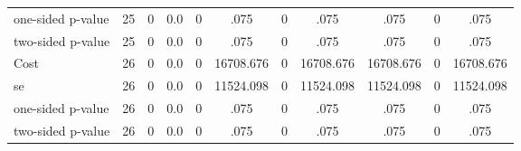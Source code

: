 \begin{tabular}{lcccccccccc}
one-sided p-value&        25 &         0 &       0.0 &         0 & .075 & 0 & .075 & .075 & 0 & .075 \\  
two-sided p-value&        25 &         0 &       0.0 &         0 & .075 & 0 & .075 & .075 & 0 & .075 \\  
Cost 			  &        26 &         0 &       0.0 &         0 & 16708.676 & 0 & 16708.676 & 16708.676 & 0 & 16708.676 \\  
se 				 &        26 &         0 &       0.0 &         0 & 11524.098 & 0 & 11524.098 & 11524.098 & 0 & 11524.098 \\  
one-sided p-value&        26 &         0 &       0.0 &         0 & .075 & 0 & .075 & .075 & 0 & .075 \\  
two-sided p-value&        26 &         0 &       0.0 &         0 & .075 & 0 & .075 & .075 & 0 & .075 \\  
\hline \hline \end{tabular}

